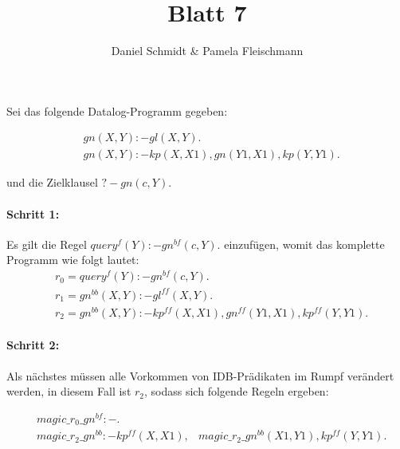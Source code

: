 \documentclass[12pt,a4paper]{amsart}
\begin{document}
\title{Blatt 7}

\author{Daniel Schmidt \& Pamela Fleischmann}

\maketitle

\begin{aufgabe1}
Sei das folgende Datalog-Programm gegeben:

\begin{align*}
&gn(X,Y) :- gl(X,Y). \\
&gn(X,Y) :- kp(X,X1), gn(Y1,X1), kp(Y,Y1).
\end{align*}

und die Zielklausel $? - gn(c,Y).$

\paragraph{Schritt 1:}
Es gilt die Regel $query^{f}(Y) :- gn^{bf}(c,Y).$ einzufügen, womit das komplette Programm wie folgt lautet: 
\begin{align*}
&r_0 = query^{f}(Y) :- gn^{bf}(c,Y). \\
&r_1 = gn^{bb}(X,Y) :- gl^{ff}(X,Y). \\
&r_2 = gn^{bb}(X,Y) :- kp^{ff}(X,X1), gn^{ff}(Y1,X1), kp^{ff}(Y,Y1).
\end{align*}

\paragraph{Schritt 2:}
Als nächstes müssen alle Vorkommen von IDB-Prädikaten im Rumpf verändert werden, in diesem Fall ist $r_2$, sodass sich folgende Regeln ergeben: 

\begin{align*}
&magic\_r_0\_gn^{bf} :- . \\
&magic\_r_2\_gn^{bb} :- kp^{ff}(X,X1), &magic\_r_2\_gn^{bb}(X1,Y1), kp^{ff}(Y,Y1).
\end{align*}

\end{aufgabe1}
\end{document}
